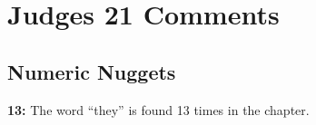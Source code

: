 \section{Judges 21 Comments}

\subsection{Numeric Nuggets}
\textbf{13: } The word ``they'' is found 13 times in the chapter.